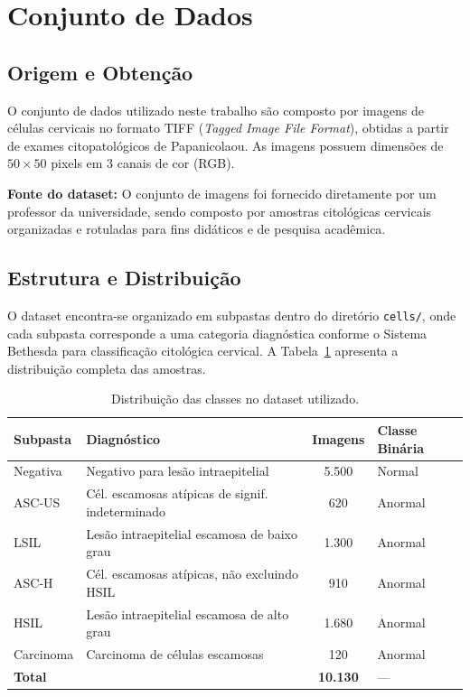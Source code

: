\documentclass[12pt, a4paper]{article}
\begin{document}
\section{Conjunto de Dados}

\subsection{Origem e Obtenção}

O conjunto de dados utilizado neste trabalho são composto por imagens de células cervicais no formato TIFF (\textit{Tagged Image File Format}), obtidas a partir de exames citopatológicos de Papanicolaou. As imagens possuem dimensões de $50 \times 50$ pixels em 3 canais de cor (RGB).

\textbf{Fonte do dataset:} O conjunto de imagens foi fornecido diretamente por um professor da universidade, sendo composto por amostras citológicas cervicais organizadas e rotuladas para fins didáticos e de pesquisa acadêmica.

\subsection{Estrutura e Distribuição}

O dataset encontra-se organizado em subpastas dentro do diretório \texttt{cells/}, onde cada subpasta corresponde a uma categoria diagnóstica conforme o Sistema Bethesda para classificação citológica cervical. A Tabela~\ref{tab:distribuicao} apresenta a distribuição completa das amostras.

\begin{table}[H]
\centering
\caption{Distribuição das classes no dataset utilizado.}
\label{tab:distribuicao}
\begin{tabular}{llcl}
\toprule
\textbf{Subpasta} & \textbf{Diagnóstico} & \textbf{Imagens} & \textbf{Classe Binária} \\
\midrule
Negativa  & Negativo para lesão intraepitelial               & 5.500 & Normal  \\
ASC-US    & Cél. escamosas atípicas de signif. indeterminado & 620   & Anormal \\
LSIL      & Lesão intraepitelial escamosa de baixo grau      & 1.300 & Anormal \\
ASC-H     & Cél. escamosas atípicas, não excluindo HSIL      & 910   & Anormal \\
HSIL      & Lesão intraepitelial escamosa de alto grau        & 1.680 & Anormal \\
Carcinoma & Carcinoma de células escamosas                    & 120   & Anormal \\
\midrule
\multicolumn{2}{l}{\textbf{Total}} & \textbf{10.130} & --- \\
\bottomrule
\end{tabular}
\end{table}
\end{document}
